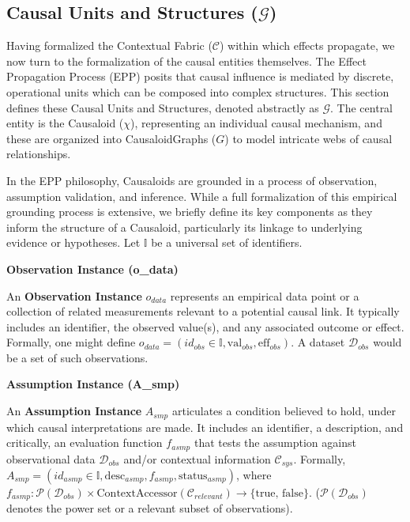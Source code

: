
\subsection[Causal Units and Structures (G)]{Causal Units and Structures (\(\mathcal{G}\))} %
\label{sec:formalization_causal_units}

Having formalized the Contextual Fabric (\(\mathcal{C}\)) within which effects propagate, we now turn to the formalization of the causal entities themselves. The Effect Propagation Process (EPP) posits that causal influence is mediated by discrete, operational units which can be composed into complex structures. This section defines these Causal Units and Structures, denoted abstractly as \(\mathcal{G}\). The central entity is the Causaloid (\(\chi\)), representing an individual causal mechanism, and these are organized into CausaloidGraphs (\(G\)) to model intricate webs of causal relationships.

In the EPP philosophy, Causaloids are grounded in a process of observation, assumption validation, and inference. While a full formalization of this empirical grounding process is extensive, we briefly define its key components as they inform the structure of a Causaloid, particularly its linkage to underlying evidence or hypotheses. Let \(\mathbb{I}\) be a universal set of identifiers.

    
\textbf{Observation Instance (o\_data)}
        
        An \textbf{Observation Instance} \(o_{data}\) represents an empirical data point or a collection of related measurements relevant to a potential causal link. It typically includes an identifier, the observed value(s), and any associated outcome or effect. Formally, one might define \(o_{data} = (id_{obs} \in \mathbb{I}, \text{val}_{obs}, \text{eff}_{obs})\). A dataset \(\mathcal{D}_{obs}\) would be a set of such observations.

\textbf{Assumption Instance (A\_smp)}

        An \textbf{Assumption Instance} \(A_{smp}\) articulates a condition believed to hold, under which causal interpretations are made. It includes an identifier, a description, and critically, an evaluation function \(f_{asmp}\) that tests the assumption against observational data \(\mathcal{D}_{obs}\) and/or contextual information \(\mathcal{C}_{sys}\). Formally, \(A_{smp} = (id_{asmp} \in \mathbb{I}, \text{desc}_{asmp}, f_{asmp}, \text{status}_{asmp})\), where \(f_{asmp}: \mathcal{P}(\mathcal{D}_{obs}) \times \text{ContextAccessor}(\mathcal{C}_{relevant}) \to \{\text{true, false}\}\). (\(\mathcal{P}(\mathcal{D}_{obs})\) denotes the power set or a relevant subset of observations).


